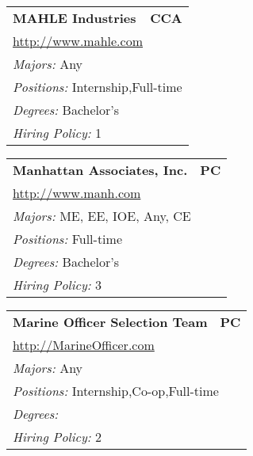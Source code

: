 \documentclass[twoside]{article}
\begin{document}
\begin{center}
\begin{multicols}{3}
\begin{FlushLeft}
\begin{minipage}{.9\columnwidth}
\end{minipage}
 
\begin{minipage}{.9\columnwidth}\begin{tabularx}{.95\columnwidth}{Xr}
                 {\Large\bf MAHLE Industries} & {\Large\bf CCA}\\
    \multicolumn{2}{p{.95\columnwidth}}{\url{http://www.mahle.com}}\\
    \multicolumn{2}{p{.95\columnwidth}}{\emph{Majors:} Any}\\
    \multicolumn{2}{p{.95\columnwidth}}{\emph{Positions:} Internship,Full-time}\\
    \multicolumn{2}{p{.95\columnwidth}}{\emph{Degrees:} Bachelor's}\\
    \multicolumn{2}{p{.95\columnwidth}}{\emph{Hiring Policy:} 1}\\
    \end{tabularx}
    
\end{minipage}
 
\begin{minipage}{.9\columnwidth}\begin{tabularx}{.95\columnwidth}{Xr}
                 {\Large\bf Manhattan Associates, Inc.} & {\Large\bf PC}\\
    \multicolumn{2}{p{.95\columnwidth}}{\url{http://www.manh.com}}\\
    \multicolumn{2}{p{.95\columnwidth}}{\emph{Majors:} ME, EE, IOE, Any, CE}\\
    \multicolumn{2}{p{.95\columnwidth}}{\emph{Positions:} Full-time}\\
    \multicolumn{2}{p{.95\columnwidth}}{\emph{Degrees:} Bachelor's}\\
    \multicolumn{2}{p{.95\columnwidth}}{\emph{Hiring Policy:} 3}\\
    \end{tabularx}
    
\end{minipage}
 
\begin{minipage}{.9\columnwidth}\begin{tabularx}{.95\columnwidth}{Xr}
                 {\Large\bf Marine Officer Selection Team} & {\Large\bf PC}\\
    \multicolumn{2}{p{.95\columnwidth}}{\url{http://MarineOfficer.com}}\\
    \multicolumn{2}{p{.95\columnwidth}}{\emph{Majors:} Any}\\
    \multicolumn{2}{p{.95\columnwidth}}{\emph{Positions:} Internship,Co-op,Full-time}\\
    \multicolumn{2}{p{.95\columnwidth}}{\emph{Degrees:} }\\
    \multicolumn{2}{p{.95\columnwidth}}{\emph{Hiring Policy:} 2}\\
    \end{tabularx}
    

\end{minipage}
\end{FlushLeft}
\end{multicols}
\end{center}
\end{document}
